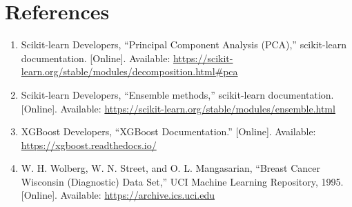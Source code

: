 \documentclass[12pt,a4paper]{article}
\DeclareRobustCommand{\_}{\textunderscore\allowbreak}
\begin{document}
\section{References}
\begin{enumerate}
\item Scikit-learn Developers, ``Principal Component Analysis (PCA),''
scikit-learn documentation. [Online]. Available:
\url{https://scikit-learn.org/stable/modules/decomposition.html#pca}
\item Scikit-learn Developers, ``Ensemble methods,'' scikit-learn
documentation. [Online]. Available:
\url{https://scikit-learn.org/stable/modules/ensemble.html}
\item XGBoost Developers, ``XGBoost Documentation.'' [Online]. Available:
\url{https://xgboost.readthedocs.io/}
\item W. H. Wolberg, W. N. Street, and O. L. Mangasarian, ``Breast Cancer
Wisconsin (Diagnostic) Data Set,'' UCI Machine Learning Repository, 1995.
[Online]. Available: \url{https://archive.ics.uci.edu}
\end{enumerate}
\end{document}
